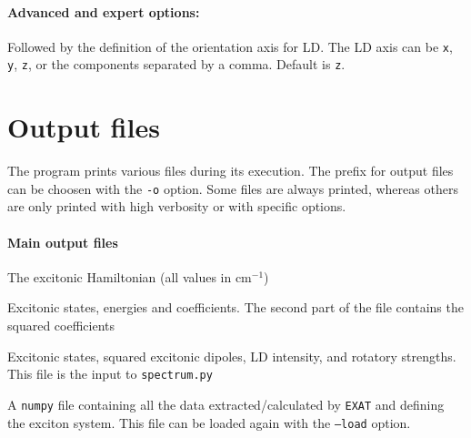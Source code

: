 \documentclass[a4paper,11pt]{article}
\begin{document}
\paragraph*{Advanced and expert options:}
\begin{description}[labelsep=10pt, align=left, labelwidth=80pt,labelindent=0pt,leftmargin=90pt]
\item[\texttt{-{}-ldaxis}] Followed by the definition of the orientation axis for LD. The LD axis can be \texttt{x}, \texttt{y}, \texttt{z}, or the components separated by a comma. Default is \texttt{z}.  
\end{description}

\section{Output files}

The program prints various files during its execution. The prefix for output files can be choosen with the \texttt{-o} option. Some files are always printed, whereas others are only printed with high verbosity or with specific options.

\paragraph*{Main output files}
\begin{description}[labelsep=10pt, align=left, labelwidth=85pt,labelindent=0pt,leftmargin=95pt]
\item[\texttt{matrix.dat}] The excitonic Hamiltonian (all values in cm$^{-1}$)
\item[\texttt{diag.dat}] Excitonic states, energies and coefficients. The second part of the file contains the squared coefficients
\item[\texttt{results.out}] Excitonic states, squared excitonic dipoles, LD intensity, and rotatory strengths. This file is the input to \texttt{spectrum.py}
\item[\texttt{exat.npz}] A \texttt{numpy} file containing all the data extracted/calculated by \texttt{EXAT} and defining the exciton system. This file can be loaded again with the \texttt{--load} option.
\end{description}
\end{document}
